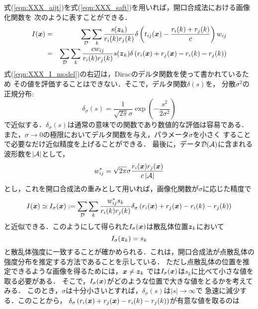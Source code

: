 式(\ref{eqn:XXX_aijt})を式(\ref{eqn:XXX_saft})を用いれば，開口合成法における画像化関数を
次のように表すことができる．
\begin{eqnarray}
	I(\mbox{\boldmath $x$})
	&=&
	\sum_{\cal D}
	\sum_{k}
	\frac{ s(\mbox{\boldmath $z$}_k)}{r_i(k)r_j(k)}
	\delta\left(t_{ij}(\mbox{\boldmath $x$})-\frac{r_i(k)+r_j(k)}{c}\right)  w_{ij}
	\\
	&=&
	\sum_{\cal D} \sum_{k}
	\frac{cw_{ij}}{r_i(k)r_j(k)} s(\mbox{\boldmath $z$}_k)
	\delta\left(r_i(\mbox{\boldmath $x$})+r_j(\mbox{\boldmath $x$})-r_i(k)-r_j(k)\right) 
	\label{eqn:XXX_I_model}
\end{eqnarray}
式(\ref{eqn:XXX_I_model})の右辺は，Diracのデルタ関数を使って書かれているため
その値を評価することはできない．そこで，デルタ関数$\delta(s)$を，
分散$\sigma^2$の正規分布:
\begin{equation}
	\delta_\sigma (s) = \frac{1}{ \sqrt{2\pi}\sigma } \exp\left( -\frac{s^2}{2\sigma^2}\right)
	\label{eqn:Gauss}
\end{equation}
で近似する．$\delta_\sigma(s)$は通常の意味での関数であり数値的な評価は容易である．
また，$\sigma\rightarrow 0$の極限においてデルタ関数を与え，パラメータ$\sigma$を小さく
することで必要なだけ近似精度を上げることができる．
最後に，データ$\cal D(A)$に含まれる波形数を$|{\cal A}|$として，
\begin{equation}
	w_{ij}^*
	=
	\sqrt{2\pi}\sigma
	\frac{r_{i}(\mbox{\boldmath $x$})r_j(\mbox{\boldmath $x$})}{c\left| {\cal A}\right|}
	\label{eqn:wij_model}
\end{equation}
とし，これを開口合成法の重みとして用いれば，画像化関数が$\sigma$に応じた精度で
\begin{equation}
	I(\mbox{\boldmath $x$})
		\simeq 
	I_\sigma(\mbox{\boldmath $x$})
		:=
	\sum_{\cal D} \sum_{k}
	\frac{w_{ij}^*s_k}{r_i(k)r_j(k)} 
	\delta_\sigma\left(r_i(\mbox{\boldmath $x$})+r_j(\mbox{\boldmath $x$})-r_i(k)-r_j(k)\right) 
	\label{eqn:XXX_saft_model}
\end{equation}
と近似できる．このようにして得られた$I_\sigma(\mbox{\boldmath $x$})$は散乱体位置$\mbox{\boldmath $z$}_k$において
\begin{equation}
	I_\sigma(\mbox{\boldmath $z$}_k)=s_k
	\label{eqn:}
\end{equation}
と散乱体強度に一致することが確かめられる．これは，開口合成法が点散乱体の
強度分布を推定する方法であることを示している．
ただし点散乱体の位置を推定できるような画像を得るためには，$\mbox{\boldmath $x$}\neq \mbox{\boldmath $z$}_k$
では$I_\sigma(\mbox{\boldmath $x$})$は$s_k$に比べて小さな値を取る必要がある．
そこで，$I_\sigma(\mbox{\boldmath $x$})$がどのような位置で大きな値をとるかを考えてみる．
このとき，$\sigma$は十分小さいとすれば，$\delta_\sigma(s)$は$|s|\rightarrow \infty$で
急速に減少する．このことから，
$\delta_\sigma\left(r_i(\mbox{\boldmath $x$})+r_j(\mbox{\boldmath $x$})-r_i(k)-r_j(k)\right)$が有意な値を取るのは
